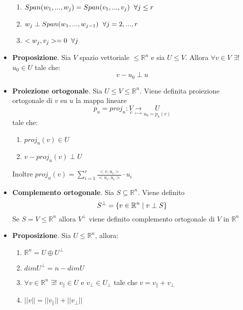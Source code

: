 \documentclass[12pt,a4paper,oneside]{book}
\begin{document}
\begin{itemize}
	  \begin{enumerate}
	  \item $Span(w_1, ..., w_j) = Span(v_1, ..., v_j) \hspace{0.2cm} \forall j\leq r$
	  \item $w_j\perp Span(w_1, ..., w_{j-1}) \hspace{0.2cm} \forall j=2, ..., r $
	  \item $<w_j, v_j> = 0 \hspace{0.2cm} \forall j$
	  \end{enumerate}	
	
\item \textbf{Proposizione}. \linebreak
	  Sia $V$ spazio vettoriale $\leq\mathbb{R}^n$ e sia $U\leq V$. Allora $\forall v\in V$ $\exists !$
	  $u_0\in U$ tale che: $$v-u_0 \perp u$$
	
\item \textbf{Proiezione ortogonale}. \linebreak
	  Sia $U\leq V\leq \mathbb{R}^n$. Viene definita proiezione ortogonale di $v$ su $u$ la mappa lineare
	  $$p_u = proj_u: \underset{v}{V} \underset{\mapsto}{\rightarrow} \underset{u_0 = p_u(v)}{U} $$
	  tale che:
	  
	  \begin{enumerate}
	  \item $proj_u(v) \in U$
	  \item $v-proj_u(v) \perp U$
	  \end{enumerate}
	  
	  Inoltre $proj_u(v) = \sum\limits_{i=1}^r \frac{<v, u_i>}{<u_i, u_i>}\cdot u_i$
	
\item \textbf{Complemento ortogonale}. \linebreak
	  Sia $S\subseteq \mathbb{R}^n$. Viene definito $$S^{\perp} = \{v\in\mathbb{R}^n \hspace{0.1cm} |
	  \hspace{0.1cm} v\perp S\}$$
	  Se $S=V\leq\mathbb{R}^n$ allora $V^{\perp}$ viene definito complemento ortogonale di $V$ in $
	  \mathbb{R} ^n$
	
\item \textbf{Proposizione}. \linebreak
	  Sia $U\leq \mathbb{R}^n$, allora:
	  
	  \begin{enumerate}
	  \item $\mathbb{R}^n = U\oplus U^{\perp}$
	  \item $dimU^{\perp} = n-dimU$
	  \item $\forall v\in\mathbb{R}^n$ $\exists !$ $v_{\parallel}\in U$ e $v_{\perp}\in U_{\perp}$ tale che
		    $v = v_{\parallel} + v_{\perp}$
	  \item $||v|| = ||v_{\parallel}|| + ||v_{\perp}||$
	  \end{enumerate}
	

\end{itemize}
\end{document}
